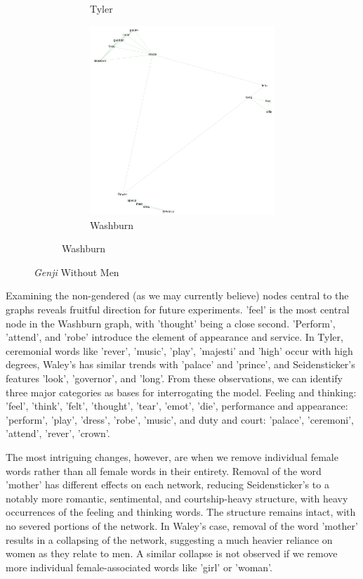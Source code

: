 \documentclass[12pt]{article}
\begin{document}
\begin{flushleft}
\begin{spacing}{2.0}
\begin{figure}
\begin{subfigure}{\linewidth}
\begin{subfigure}{.5\linewidth}
	  		\caption{Tyler}		
		\end{subfigure}
		\begin{subfigure}{.5\linewidth}
	  		\includegraphics[width=3in]{washburn-no-menwords.png}\hfill
	  		\caption{Washburn}		
		\end{subfigure}
	\end{subfigure}
	\caption{\textit{Genji} Without Men}
	\label{networks-without-men}
\end{figure}

Examining the non-gendered (as we may currently believe) nodes central to the graphs reveals fruitful direction for future experiments. 'feel' is the most central node in the Washburn graph, with 'thought' being a close second. 'Perform', 'attend', and 'robe' introduce the element of appearance and service. In Tyler, ceremonial words like 'rever', 'music', 'play', 'majesti' and 'high' occur with high degrees, Waley's has similar trends with 'palace' and 'prince', and Seidensticker's features 'look', 'governor', and 'long'. From these observations, we can identify three major categories as bases for interrogating the model. Feeling and thinking: 'feel', 'think', 'felt', 'thought', 'tear', 'emot', 'die', performance and appearance: 'perform', 'play', 'dress', 'robe', 'music', and duty and court: 'palace', 'ceremoni', 'attend', 'rever', 'crown'.

The most intriguing changes, however, are when we remove individual female words rather than all female words in their entirety. Removal of the word 'mother' has different effects on each network, reducing Seidensticker's to a notably more romantic, sentimental, and courtship-heavy structure, with heavy occurrences of the feeling and thinking words. The structure remains intact, with no severed portions of the network. In Waley's case, removal of the word 'mother' results in a collapsing of the network, suggesting a much heavier reliance on women as they relate to men. A similar collapse is not observed if we remove more individual female-associated words like 'girl' or 'woman'.


\end{spacing}
\end{flushleft}
\end{document}
